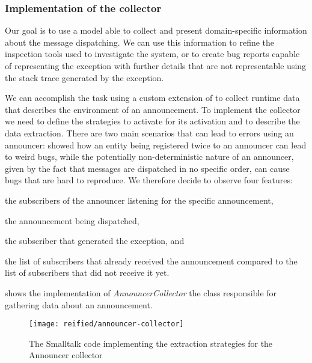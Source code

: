 \subsubsection{Implementation of the collector}

Our goal is to use a model able to collect and present domain-specific information about the message dispatching.
We can use this information to refine the inspection tools used to investigate the system, or to create bug reports capable of representing the exception with further details that are not representable using the stack trace generated by the exception.

We can accomplish the task using a custom extension of \sln to collect runtime data that describes the environment of an announcement.
To implement the collector we need to define the strategies to activate for its activation and to describe the data extraction.
There are two main scenarios that can lead to errors using an announcer:  showed how an entity being registered twice to an announcer can lead to weird bugs, while the potentially non-deterministic nature of an announcer, given by the fact that messages are dispatched in no specific order, can cause bugs that are hard to reproduce.
We therefore decide to observe four features:
%
\begin{inparaenum}[(1)]
  \item the subscribers of the announcer listening for the specific announcement,
  \item the announcement being dispatched,
  \item the subscriber that generated the exception, and
  \item the list of subscribers that already received the announcement compared to the list of subscribers that did not receive it yet.
\end{inparaenum}
%
 shows the implementation of \textit{AnnouncerCollector} the class responsible for gathering data about an announcement.

\begin{figure}[t]
\centering
\texttt{[image: reified/announcer-collector]}
\caption{The Smalltalk code implementing the extraction strategies for the Announcer collector}
\label{fig:announcer-code}
\end{figure}

